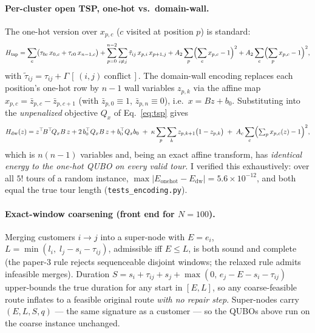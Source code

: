 \documentclass[10pt,a4paper]{article}
\begin{document}
\paragraph{Per-cluster open TSP, one-hot vs.\ domain-wall.} The one-hot
version over $x_{p,c}$ ($c$ visited at position $p$) is standard:
\begin{equation}
H_{\mathrm{tsp}} = \sum_{c}\bigl(\tau_{0c}\,x_{0,c} + \tau_{c0}\,x_{n-1,c}\bigr)
+ \sum_{p=0}^{n-2}\sum_{i\neq j}\tilde\tau_{ij}\,x_{p,i}\,x_{p+1,j}
+ A_2\sum_{p}\Bigl(\sum_c x_{p,c}-1\Bigr)^{2}
+ A_2\sum_{c}\Bigl(\sum_p x_{p,c}-1\Bigr)^{2},
\label{eq:tsp}
\end{equation}
with $\tilde\tau_{ij} = \tau_{ij} + \Gamma\,[\,(i,j)\ \text{conflict}\,]$. The
domain-wall encoding replaces each position's one-hot row by $n-1$ wall
variables $z_{p,k}$ via the affine map $x_{p,c} = \bar z_{p,c} - \bar
z_{p,c+1}$ (with $\bar z_{p,0}\equiv 1$, $\bar z_{p,n}\equiv 0$), i.e.\ $x = Bz
+ b_0$. Substituting into the \emph{unpenalized} objective $Q_x$ of
Eq.~\eqref{eq:tsp} gives
\begin{equation}
H_{\mathrm{dw}}(z) = z^\top\! B^\top\! Q_x B\, z + 2\,b_0^\top Q_x B\, z + b_0^\top Q_x b_0
\;+\; \kappa \sum_{p}\sum_{k} z_{p,k+1}\bigl(1 - z_{p,k}\bigr)
\;+\; A_c \sum_{c}\Bigl(\textstyle\sum_p x_{p,c}(z)-1\Bigr)^{2},
\label{eq:dw}
\end{equation}
which is $n(n-1)$ variables and, being an exact affine transform, has
\emph{identical energy to the one-hot QUBO on every valid tour}. I verified
this exhaustively: over all $5!$ tours of a random instance,
$\max|E_{\mathrm{onehot}} - E_{\mathrm{dw}}| = 5.6\times10^{-12}$, and both
equal the true tour length (\texttt{tests\_encoding.py}).

\paragraph{Exact-window coarsening (front end for $N=100$).} Merging customers
$i\!\to\!j$ into a super-node with $E = e_i$, $L = \min(l_i,\; l_j - s_i -
\tau_{ij})$, admissible iff $E\le L$, is both sound and complete (the paper-3
rule rejects sequenceable disjoint windows; the relaxed rule admits infeasible
merges). Duration $S = s_i + \tau_{ij} + s_j + \max(0,\, e_j - E - s_i -
\tau_{ij})$ upper-bounds the true duration for any start in $[E,L]$, so any
coarse-feasible route inflates to a feasible original route \emph{with no
repair step}. Super-nodes carry $(E,L,S,q)$ --- the same signature as a
customer --- so the QUBOs above run on the coarse instance unchanged.
\end{document}
